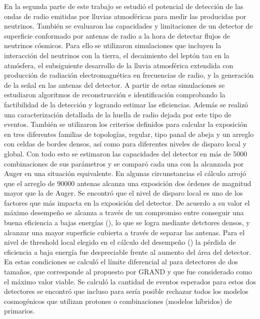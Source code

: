 En la segunda parte de este trabajo se estudi\'o el potencial de detecci\'on de las ondas de radio emitidas por lluvias atmosf\'ericas para medir las producidas por neutrinos.
Tambi\'en se evaluaron las capacidades y limitaciones de un detector de superficie conformado por antenas de radio a la hora de detectar flujos de neutrinos c\'osmicos.
Para ello se utilizaron simulaciones que incluyen la interacci\'on del neutrinos con la tierra, el decaimiento del lept\'on tau en la atm\'osfera, el subsiguiente desarrollo de la lluvia atmosf\'erica extendida con producci\'on de radiaci\'on electromagn\'etica en frecuencias de radio, y la generaci\'on de la se\~nal en las antenas del detector.
A partir de estas simulaciones se estudiaron algoritmos de reconstrucci\'on e identificaci\'on comprobando la factibilidad de la detecci\'on y logrando estimar las eficiencias.
Adem\'as se realiz\'o una caracterizaci\'on detallada de la huella de radio dejada por este tipo de eventos.
Tambi\'en se utilizaron los criterios definidos para calcular la exposici\'on en tres diferentes familias de topolog\'ias, regular, tipo panal de abeja y un arreglo con celdas de bordes densos, as\'i como para diferentes niveles de disparo local y global.
Con todo esto se estimaron las capacidades del detector en m\'as de 5000 combinaciones de sus par\'ametros y se compar\'o cada una con la alcanzada por Auger en una situaci\'on equivalente.
En algunas circunstancias el c\'alculo arroj\'o que el arreglo de 90000 antenas alcanza una exposici\'on dos \'ordenes de magnitud mayor que la de Auger.
Se encontr\'o que el nivel de disparo local es uno de los factores que m\'as impacta en la exposici\'on del detector.
De acuerdo a su valor el m\'aximo desempe\~no se alcanza a trav\'es de un compromiso entre conseguir una buena eficiencia a bajas energ\'ias (), lo que se logra mediante detctores densos, y alcanzar una mayor superficie cubierta a trav\'es de separar las antenas.
Para el nivel de threshold local elegido en el c\'alculo del desempe\~no () la p\'erdida de eficiencia a baja energ\'ia fue despreciable frente al aumento del \'area del detector. En estas condiciones se calcul\'o el l\'imite diferencial al  para detectores de dos tama\~nos,  que corresponde al propuesto por GRAND y  que fue considerado como el m\'aximo valor viable.
Se calcul\'o la cantidad de eventos esperados para estos dos detectores se encontr\'o que incluso para  ser\'ia posible rechazar todos los modelos cosmog\'enicos que utilizan protones o combinaciones (modelos h\'ibridos) de primarios.
